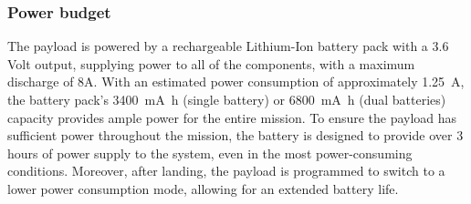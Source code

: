 \subsubsection{Power budget}

The payload is powered by a rechargeable Lithium-Ion battery pack with a 3.6 Volt output, supplying power to all of the components, with a maximum discharge of 8A. With an estimated power consumption of approximately \SI{1.25}{\ampere}, the battery pack's \SI{3400}{\milli\ampere\hour} (single battery) or \SI{6800}{\milli\ampere\hour} (dual batteries) capacity provides ample power for the entire mission. To ensure the payload has sufficient power throughout the mission, the battery is designed to provide over 3 hours of power supply to the system, even in the most power-consuming conditions. Moreover, after landing, the payload is programmed to switch to a lower power consumption mode, allowing for an extended battery life.


    

